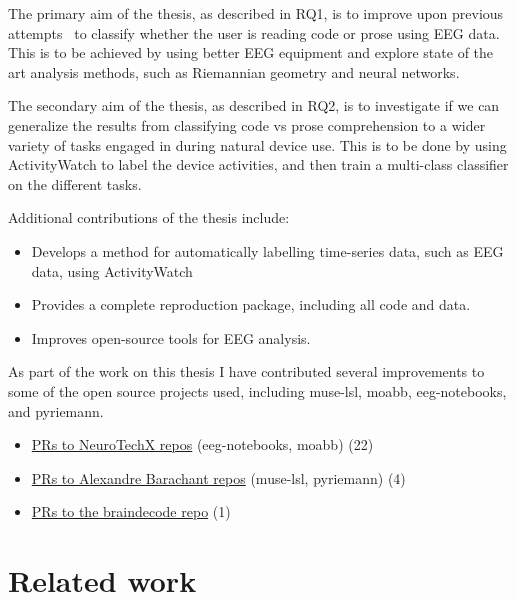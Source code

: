    The primary aim of the thesis, as described in RQ1, is to improve upon previous attempts~\cite{fucci_replication_2019} to classify whether the user is reading code or prose using EEG data. This is to be achieved by using better EEG equipment and explore state of the art analysis methods, such as Riemannian geometry and neural networks.

    The secondary aim of the thesis, as described in RQ2, is to investigate if we can generalize the results from classifying code vs prose comprehension to a wider variety of tasks engaged in during natural device use. This is to be done by using ActivityWatch to label the device activities, and then train a multi-class classifier on the different tasks.

    Additional contributions of the thesis include:

    \begin{itemize}
        \item Develops a method for automatically labelling time-series data, such as EEG data, using ActivityWatch
        \item Provides a complete reproduction package, including all code and data.
        \item Improves open-source tools for EEG analysis.
    \end{itemize}

    As part of the work on this thesis I have contributed several improvements to some of the open source projects used, including muse-lsl, moabb, eeg-notebooks, and pyriemann.

    \begin{itemize}
        \item \href{%
                https://github.com/search?q=org%
            }{PRs to NeuroTechX repos} (eeg-notebooks, moabb) (22)
        \item \href{%
                https://github.com/search?q=org%
            }{PRs to Alexandre Barachant repos} (muse-lsl, pyriemann) (4)
        \item \href{%
                https://github.com/search?q=org%
            }{PRs to the braindecode repo} (1)
    \end{itemize}


\section{Related work}

